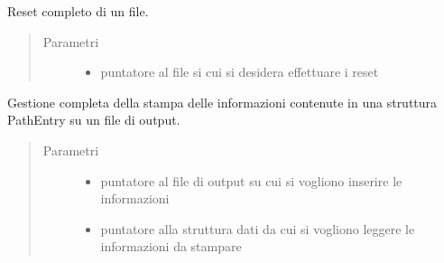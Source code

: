 \documentclass[letterpaper,10pt,italian,openany,oneside]{sphinxmanual}
\begin{document}
\begin{fulllineitems}
\label{\detokenize{code/scan:c.cleanFile}}
Reset completo di un file.
\begin{quote}\begin{description}
\item[{Parametri}] \leavevmode\begin{itemize}
\item {} 
 \textendash{} puntatore al file si cui si desidera effettuare i reset

\end{itemize}

\end{description}\end{quote}

\end{fulllineitems}


\begin{fulllineitems}
\label{\detokenize{code/scan:c.printOnOutput}}
Gestione completa della stampa delle informazioni contenute in una struttura PathEntry su un file di output.
\begin{quote}\begin{description}
\item[{Parametri}] \leavevmode\begin{itemize}
\item {} 
 \textendash{} puntatore al file di output su cui si vogliono inserire le informazioni

\item {} 
 \textendash{} puntatore alla struttura dati da cui si vogliono leggere le informazioni da stampare

\end{itemize}

\end{description}\end{quote}

\end{fulllineitems}
\end{document}
